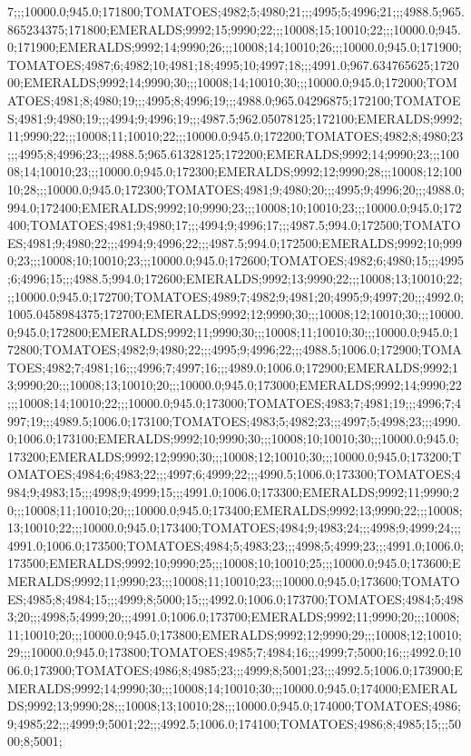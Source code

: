 7;;;10000.0;945.0;171800;TOMATOES;4982;5;4980;21;;;4995;5;4996;21;;;4988.5;965.865234375;171800;EMERALDS;9992;15;9990;22;;;10008;15;10010;22;;;10000.0;945.0;171900;EMERALDS;9992;14;9990;26;;;10008;14;10010;26;;;10000.0;945.0;171900;TOMATOES;4987;6;4982;10;4981;18;4995;10;4997;18;;;4991.0;967.634765625;172000;EMERALDS;9992;14;9990;30;;;10008;14;10010;30;;;10000.0;945.0;172000;TOMATOES;4981;8;4980;19;;;4995;8;4996;19;;;4988.0;965.04296875;172100;TOMATOES;4981;9;4980;19;;;4994;9;4996;19;;;4987.5;962.05078125;172100;EMERALDS;9992;11;9990;22;;;10008;11;10010;22;;;10000.0;945.0;172200;TOMATOES;4982;8;4980;23;;;4995;8;4996;23;;;4988.5;965.61328125;172200;EMERALDS;9992;14;9990;23;;;10008;14;10010;23;;;10000.0;945.0;172300;EMERALDS;9992;12;9990;28;;;10008;12;10010;28;;;10000.0;945.0;172300;TOMATOES;4981;9;4980;20;;;4995;9;4996;20;;;4988.0;994.0;172400;EMERALDS;9992;10;9990;23;;;10008;10;10010;23;;;10000.0;945.0;172400;TOMATOES;4981;9;4980;17;;;4994;9;4996;17;;;4987.5;994.0;172500;TOMATOES;4981;9;4980;22;;;4994;9;4996;22;;;4987.5;994.0;172500;EMERALDS;9992;10;9990;23;;;10008;10;10010;23;;;10000.0;945.0;172600;TOMATOES;4982;6;4980;15;;;4995;6;4996;15;;;4988.5;994.0;172600;EMERALDS;9992;13;9990;22;;;10008;13;10010;22;;;10000.0;945.0;172700;TOMATOES;4989;7;4982;9;4981;20;4995;9;4997;20;;;4992.0;1005.0458984375;172700;EMERALDS;9992;12;9990;30;;;10008;12;10010;30;;;10000.0;945.0;172800;EMERALDS;9992;11;9990;30;;;10008;11;10010;30;;;10000.0;945.0;172800;TOMATOES;4982;9;4980;22;;;4995;9;4996;22;;;4988.5;1006.0;172900;TOMATOES;4982;7;4981;16;;;4996;7;4997;16;;;4989.0;1006.0;172900;EMERALDS;9992;13;9990;20;;;10008;13;10010;20;;;10000.0;945.0;173000;EMERALDS;9992;14;9990;22;;;10008;14;10010;22;;;10000.0;945.0;173000;TOMATOES;4983;7;4981;19;;;4996;7;4997;19;;;4989.5;1006.0;173100;TOMATOES;4983;5;4982;23;;;4997;5;4998;23;;;4990.0;1006.0;173100;EMERALDS;9992;10;9990;30;;;10008;10;10010;30;;;10000.0;945.0;173200;EMERALDS;9992;12;9990;30;;;10008;12;10010;30;;;10000.0;945.0;173200;TOMATOES;4984;6;4983;22;;;4997;6;4999;22;;;4990.5;1006.0;173300;TOMATOES;4984;9;4983;15;;;4998;9;4999;15;;;4991.0;1006.0;173300;EMERALDS;9992;11;9990;20;;;10008;11;10010;20;;;10000.0;945.0;173400;EMERALDS;9992;13;9990;22;;;10008;13;10010;22;;;10000.0;945.0;173400;TOMATOES;4984;9;4983;24;;;4998;9;4999;24;;;4991.0;1006.0;173500;TOMATOES;4984;5;4983;23;;;4998;5;4999;23;;;4991.0;1006.0;173500;EMERALDS;9992;10;9990;25;;;10008;10;10010;25;;;10000.0;945.0;173600;EMERALDS;9992;11;9990;23;;;10008;11;10010;23;;;10000.0;945.0;173600;TOMATOES;4985;8;4984;15;;;4999;8;5000;15;;;4992.0;1006.0;173700;TOMATOES;4984;5;4983;20;;;4998;5;4999;20;;;4991.0;1006.0;173700;EMERALDS;9992;11;9990;20;;;10008;11;10010;20;;;10000.0;945.0;173800;EMERALDS;9992;12;9990;29;;;10008;12;10010;29;;;10000.0;945.0;173800;TOMATOES;4985;7;4984;16;;;4999;7;5000;16;;;4992.0;1006.0;173900;TOMATOES;4986;8;4985;23;;;4999;8;5001;23;;;4992.5;1006.0;173900;EMERALDS;9992;14;9990;30;;;10008;14;10010;30;;;10000.0;945.0;174000;EMERALDS;9992;13;9990;28;;;10008;13;10010;28;;;10000.0;945.0;174000;TOMATOES;4986;9;4985;22;;;4999;9;5001;22;;;4992.5;1006.0;174100;TOMATOES;4986;8;4985;15;;;5000;8;5001;